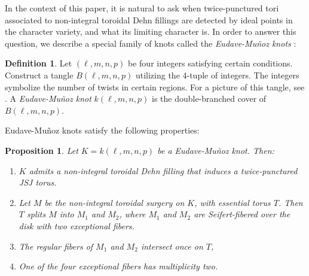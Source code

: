\documentclass{article}
\theoremstyle{plain}
\theoremstyle{definition}
\newtheorem{definition}[theorem]{Definition}
\theoremstyle{plain}
\newtheorem{prop}[theorem]{Proposition}
\theoremstyle{plain}
\theoremstyle{plain}
\theoremstyle{remark}
\theoremstyle{remark}
\theoremstyle{plain}
\theoremstyle{plain}
\begin{document}
In the context of this paper, it is natural to ask when twice-punctured tori associated to non-integral toroidal Dehn fillings are detected by ideal points in the character variety, and what its limiting character is. In order to answer this question, we describe a special family of knots called the \emph{Eudave-Muñoz knots} \cite{eudavemunoz}:

\begin{definition}
Let $(\ell, m, n, p)$ be four integers satisfying certain conditions. Construct a tangle $B(\ell, m, n, p)$ utilizing the 4-tuple of integers. The integers symbolize the number of twists in certain regions. For a picture of this tangle, see \cite{eudavemunoz}. A \emph{Eudave-Muñoz knot} $k(\ell, m, n, p)$ is the double-branched cover of $B(\ell, m, n, p)$.
\end{definition}

Eudave-Muñoz knots satisfy the following properties:

\begin{prop}\label{prop:eudavemunoz}\cite{eudavemunoz}
Let $K = k(\ell, m, n, p)$ be a Eudave-Muñoz knot. Then:
\begin{enumerate}
	\item $K$ admits a non-integral toroidal Dehn filling that induces a twice-punctured JSJ torus.
	\item Let $M$ be the non-integral toroidal surgery on $K$, with essential torus $T$. Then $T$ splits $M$ into $M_1$ and $M_2$, where $M_1$ and $M_2$ are Seifert-fibered over the disk with two exceptional fibers. 
	\item The regular fibers of $M_1$ and $M_2$ intersect once on $T$,
	\item One of the four exceptional fibers has multiplicity two. 
\end{enumerate}
\end{prop}
\end{document}
